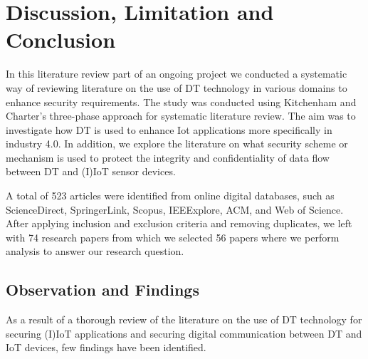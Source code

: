 \chapter{Discussion, Limitation and Conclusion}
\label{Chapter4} %

In this literature review part of an ongoing project we conducted a systematic way of reviewing literature  on the use of DT technology in various domains to enhance security requirements. The study was conducted using Kitchenham and Charter's three-phase approach for systematic literature review. The aim was to investigate how DT is used to enhance Iot applications more specifically in industry 4.0. In addition, we explore the literature on what security scheme or mechanism is used to protect the integrity and confidentiality of data flow between DT and (I)IoT sensor devices.

A total of 523 articles were identified from online digital databases, such as ScienceDirect, SpringerLink, Scopus, IEEExplore, ACM, and Web of Science. After applying inclusion and exclusion criteria and removing duplicates, we left with 74 research papers from which we selected 56 papers where we perform analysis to answer our research question.

\section{Observation and Findings}
As a result of a thorough review of the literature on the use of DT technology for securing (I)IoT applications and securing digital communication between DT and IoT devices, few findings have been identified.

